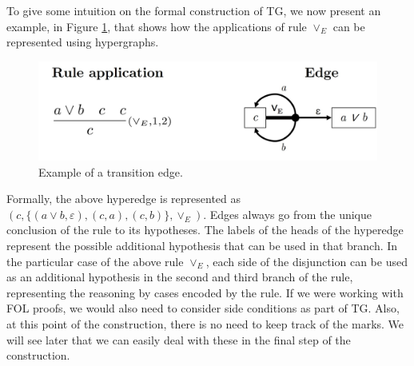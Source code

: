 To give some intuition on the formal construction of TG, we now present an example, in Figure \ref{fig:te-ex}, that shows how the applications of rule \(\vee_E\) can be represented using hypergraphs.



    \begin{figure}[h]
        \centering
        \includegraphics[width=0.8\linewidth]{resources/te-example.jpg}
        \caption{Example of a transition edge.}
        \label{fig:te-ex}
    \end{figure}

Formally, the above hyperedge is represented as $(c, \{(a \vee b, \varepsilon), (c, a), (c, b)\}, \vee_E)$. Edges always go from the unique conclusion of the rule to its hypotheses. The labels of the heads of the hyperedge represent the possible additional hypothesis that can be used in that branch. In the particular case of the above rule $\vee_E$, each side of the disjunction can be used as an additional hypothesis in the second and third branch of the rule, representing the reasoning by cases encoded by the rule. 
If we were working with FOL proofs, we would also need to consider side conditions as part of TG. 
Also, at this point of the construction, there is no need to keep track of the marks. We will see later that we can easily deal with these in the final step of the construction.

